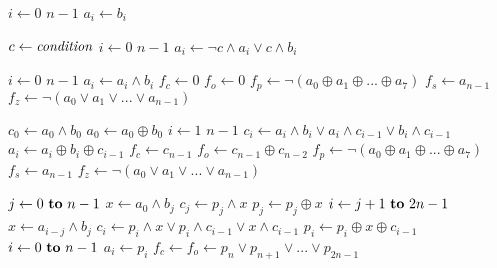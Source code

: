 \documentclass{beamer}
\renewcommand{\gets}{\leftarrow}
\newcommand{\AND}{\land}
\newcommand{\IOR}{\lor}
\newcommand{\XOR}{\oplus}
\newcommand{\NOT}{\lnot}
\begin{document}
\begin{frame}
\begin{codebox}
\zi \For $i \gets 0$ \To $n-1$
\zi \Do
      $a_i \gets b_i$
    \End
\end{codebox}
\end{frame}

\begin{frame}
\begin{codebox}
\zi $c \gets \id{condition}$
\zi \For $i \gets 0$ \To $n-1$
\zi \Do
      $a_i \gets \NOT c \AND a_i \IOR c \AND b_i$
    \End
\end{codebox}
\end{frame}

\begin{frame}
\begin{codebox}
\zi \For $i \gets 0$ \To $n-1$ \Do
\zi   $a_i \gets a_i \AND b_i$ \End
\zi $f_c \gets 0$
\zi $f_o \gets 0$
\zi $f_p \gets \NOT(a_0 \XOR a_1 \XOR ... \XOR a_7)$
\zi $f_s \gets a_{n-1}$
\zi $f_z \gets \NOT(a_0 \IOR a_1 \IOR ... \IOR a_{n-1})$
\end{codebox}
\end{frame}

\begin{frame}
\begin{codebox}
\zi $c_0 \gets a_0 \AND b_0$
\zi $a_0 \gets a_0 \XOR b_0$
\zi \For $i \gets 1$ \To $n-1$ \Do
\zi   $c_i \gets a_i \AND b_i \IOR a_i \AND c_{i-1} \IOR b_i \AND c_{i-1}$
\zi   $a_i \gets a_i \XOR b_i \XOR c_{i-1}$ \End
\zi $f_c \gets c_{n-1}$
\zi $f_o \gets c_{n-1} \XOR c_{n-2}$
\zi $f_p \gets \NOT(a_0 \XOR a_1 \XOR ... \XOR a_7)$
\zi $f_s \gets a_{n-1}$
\zi $f_z \gets \NOT(a_0 \IOR a_1 \IOR ... \IOR a_{n-1})$
\end{codebox}
\end{frame}

\begin{frame}
\begin{codebox}
\zi \For $j \gets 0 \To n-1$ \Do
\zi   $x \gets a_{0} \AND b_{j}$
\zi   $c_{j} \gets p_{j} \AND x$
\zi   $p_{j} \gets p_{j} \XOR x$
\zi   \For $i \gets j+1 \To 2n-1$ \Do
\zi     $x \gets a_{i-j} \AND b_{j}$
\zi     $c_{i} \gets p_{i} \AND x \IOR p_{i} \AND c_{i-1} \IOR x \AND c_{i-1}$
\zi     $p_{i} \gets p_{i} \XOR x \XOR c_{i-1}$ \End \End
\zi \For $i \gets 0 \To n-1$ \Do
\zi   $a_{i} \gets p_{i}$ \End
\zi $f_c \gets f_o \gets p_{n} \IOR p_{n+1} \IOR ... \IOR p_{2n-1}$
\end{codebox}
\end{frame}
\end{document}
